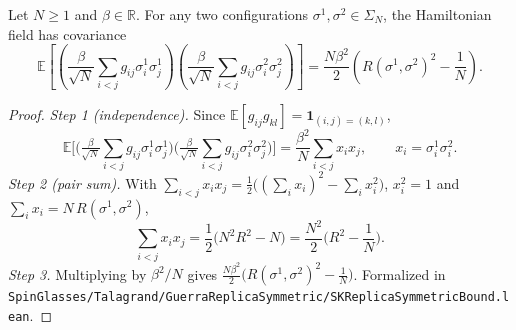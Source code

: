 \begin{theorem}\label{thm:sg-tal:covariance}
  \leanok
{}
Let $N\ge1$ and $\beta\in\mathbb R$. For any two configurations $\sigma^1, \sigma^2 \in \Sigma_N$, the Hamiltonian field has covariance
\[
\mathbb{E}\left[\left(\frac{\beta}{\sqrt{N}} \sum_{i < j} g_{ij} \sigma_i^1 \sigma_j^1\right)\left(\frac{\beta}{\sqrt{N}} \sum_{i < j} g_{ij} \sigma_i^2 \sigma_j^2\right)\right] = \frac{N \beta^2}{2}\left(R(\sigma^1, \sigma^2)^2 - \frac{1}{N}\right).
\]
\end{theorem}
\begin{proof}
  \leanok
\emph{Step 1 (independence).} Since $\mathbb E[g_{ij}g_{kl}]=\mathbf 1_{(i,j)=(k,l)}$,
\[
\mathbb E\Big[\Big(\tfrac\beta{\sqrt N}\sum_{i<j}g_{ij}\sigma^1_i\sigma^1_j\Big)\Big(\tfrac\beta{\sqrt N}\sum_{i<j}g_{ij}\sigma^2_i\sigma^2_j\Big)\Big]=\frac{\beta^2}N\sum_{i<j}x_ix_j,\qquad x_i=\sigma^1_i\sigma^2_i .
\]
\emph{Step 2 (pair sum).} With $\sum_{i<j}x_ix_j=\frac12\big((\sum_ix_i)^2-\sum_ix_i^2\big)$, $x_i^2=1$ and $\sum_ix_i=N\,R(\sigma^1,\sigma^2)$,
\[
\sum_{i<j}x_ix_j=\frac12\big(N^2R^2-N\big)=\frac{N^2}2\Big(R^2-\frac1N\Big).
\]
\emph{Step 3.} Multiplying by $\beta^2/N$ gives $\frac{N\beta^2}2\big(R(\sigma^1,\sigma^2)^2-\frac1N\big)$.
Formalized in \texttt{SpinGlasses/Talagrand/GuerraReplicaSymmetric/SKReplicaSymmetricBound.lean}.
\end{proof}

